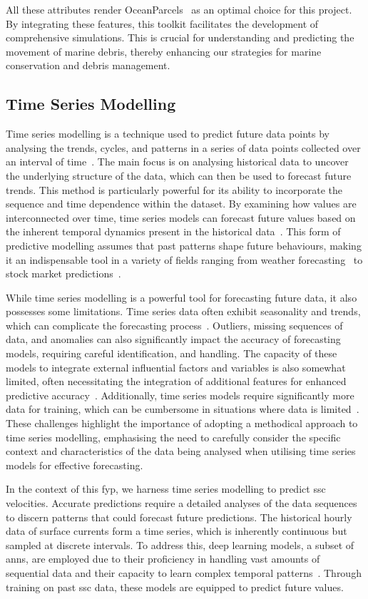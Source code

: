 All these attributes render OceanParcels~\cite{20} as an optimal choice for this project. By integrating these features, this toolkit facilitates the development of comprehensive simulations. This is crucial for understanding and predicting the movement of marine debris, thereby enhancing our strategies for marine conservation and debris management.

\subsection{Time Series Modelling}
\label{subsec:2.1.4}
Time series modelling is a technique used to predict future data points by analysing the trends, cycles, and patterns in a series of data points collected over an interval of time~\cite{23}. The main focus is on analysing historical data to uncover the underlying structure of the data, which can then be used to forecast future trends. This method is particularly powerful for its ability to incorporate the sequence and time dependence within the dataset. By examining how values are interconnected over time, time series models can forecast future values based on the inherent temporal dynamics present in the historical data~\cite{24}. This form of predictive modelling assumes that past patterns shape future behaviours, making it an indispensable tool in a variety of fields ranging from weather forecasting~\cite{25} to stock market predictions~\cite{26}. 

While time series modelling is a powerful tool for forecasting future data, it also possesses some limitations. Time series data often exhibit seasonality and trends, which can complicate the forecasting process~\cite{27}. Outliers, missing sequences of data, and anomalies can also significantly impact the accuracy of forecasting models, requiring careful identification, and handling. The capacity of these models to integrate external influential factors and variables is also somewhat limited, often necessitating the integration of additional features for enhanced predictive accuracy~\cite{28}. Additionally, time series models require significantly more data for training, which can be cumbersome in situations where data is limited~\cite{28}. These challenges highlight the importance of adopting a methodical approach to time series modelling, emphasising the need to carefully consider the specific context and characteristics of the data being analysed when utilising time series models for effective forecasting.

In the context of this \acrshort{fyp}, we harness time series modelling to predict \acrshort{ssc} velocities. Accurate predictions require a detailed analyses of the data sequences to discern patterns that could forecast future predictions. The historical hourly data of surface currents form a time series, which is inherently continuous but sampled at discrete intervals. To address this, deep learning models, a subset of \acrshort{ann}s, are employed due to their proficiency in handling vast amounts of sequential data and their capacity to learn complex temporal patterns~\cite{29}. Through training on past \acrshort{ssc} data, these models are equipped to predict future values.

